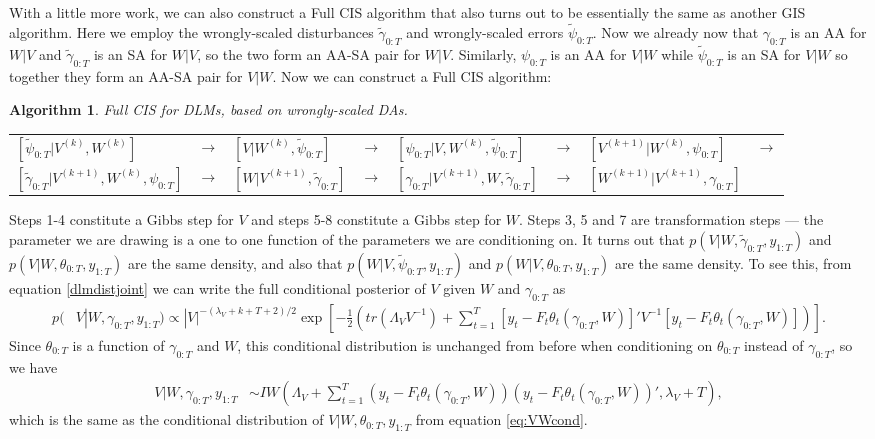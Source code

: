 \documentclass{article}
\newtheorem{alg}{Algorithm}
\begin{document}
With a little more work, we can also construct a Full CIS algorithm that also turns out to be essentially the same as another GIS algorithm. Here we employ the wrongly-scaled disturbances $\tilde{\gamma}_{0:T}$ and wrongly-scaled errors $\tilde{\psi}_{0:T}$. Now we already now that $\gamma_{0:T}$ is an AA for $W|V$ and $\tilde{\gamma}_{0:T}$ is an SA for $W|V$, so the two form an AA-SA pair for $W|V$. Similarly,  $\psi_{0:T}$ is an AA for $V|W$ while $\tilde{\psi}_{0:T}$ is an SA for $V|W$ so together they form an AA-SA pair for $V|W$. Now we can construct a Full CIS algorithm:
\begin{alg}Full CIS for DLMs, based on wrongly-scaled DAs.\label{alg:FCIS}\\
  \begin{center}
    \begin{tabular}{llllllll}
      $[\tilde{\psi}_{0:T}|V^{(k)},W^{(k)}]$& $\to$& $[V|W^{(k)},\tilde{\psi}_{0:T}]$& $\to$& $[\psi_{0:T}|V,W^{(k)},\tilde{\psi}_{0:T}]$& $\to$& $[V^{(k+1)}|W^{(k)},\psi_{0:T}]$& $\to$\\
      $[\tilde{\gamma}_{0:T}|V^{(k+1)},W^{(k)},\psi_{0:T}]$&$\to$& $[W|V^{(k+1)},\tilde{\gamma}_{0:T}]$& $\to$& $[\gamma_{0:T}|V^{(k+1)},W,\tilde{\gamma}_{0:T}]$& $\to$& $[W^{(k+1)}|V^{(k+1)},\gamma_{0:T}]$
    \end{tabular}
  \end{center}
\end{alg}
Steps 1-4 constitute a Gibbs step for $V$ and steps 5-8 constitute a Gibbs step for $W$. Steps 3, 5 and 7 are transformation steps --- the parameter we are drawing is a one to one function of the parameters we are conditioning on. It turns out that $p(V|W,\tilde{\gamma}_{0:T},y_{1:T})$ and $p(V|W,\theta_{0:T},y_{1:T})$ are the same density, and also that $p(W|V,\tilde{\psi}_{0:T},y_{1:T})$ and $p(W|V,\theta_{0:T},y_{1:T})$ are the same density. To see this, from equation \eqref{dlmdistjoint} we can write the full conditional posterior of $V$ given $W$ and $\gamma_{0:T}$ as
 \begin{align*}
  p(&V|W,\gamma_{0:T},y_{1:T}) \propto |V|^{-(\lambda_V + k + T + 2)/2} \exp\left[-\frac{1}{2}\left(tr\left(\Lambda_VV^{-1}\right) + \sum_{t=1}^T\left[y_t-F_t\theta_t(\gamma_{0:T},W)\right]'V^{-1}\left[y_t-F_t\theta_t(\gamma_{0:T},W)\right]\right)\right].
 \end{align*}
Since $\theta_{0:T}$ is a function of $\gamma_{0:T}$ and $W$, this conditional distribution is unchanged from before when conditioning on $\theta_{0:T}$ instead of $\gamma_{0:T}$, so we have 
\begin{align*}
  V|W,\gamma_{0:T},y_{1:T} &\sim IW\left(\Lambda_V + \sum_{t=1}^T(y_t-F_t\theta_t(\gamma_{0:T},W))(y_t-F_t\theta_t(\gamma_{0:T},W))',\lambda_V + T\right),
\end{align*}
which is the same as the conditional distribution of $V|W,\theta_{0:T},y_{1:T}$ from equation \eqref{eq:VWcond}.
\end{document}
